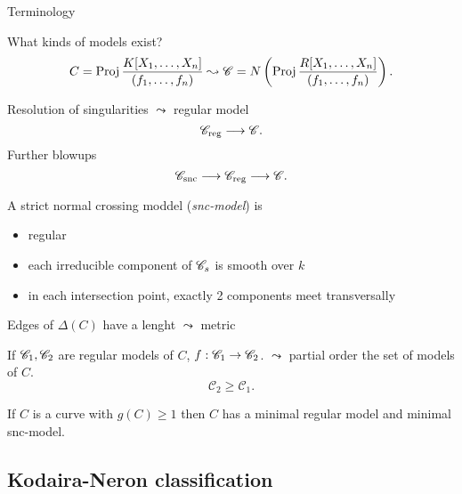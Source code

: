 \begin{frame}{Terminology}
\begin{figure}[ht]
    \centering
\end{figure}
\end{frame}




\begin{frame}[t]
	What kinds of models exist?\[
		C = \operatorname{Proj} \frac{K[X_1, \ldots, X_n]}{(f_1, \ldots, f_n)}
		\leadsto \mathscr C = N\left(\operatorname{Proj} \frac{R[X_1, \ldots, X_n]}{(f_1, \ldots, f_n)}\right)
	.\] 
	\begin{minipage}{.49\textwidth}
	Resolution of singularities $\leadsto $ regular model 
	\[
		\mathscr C _\text{reg}  \longrightarrow \mathscr C 
	.\]
	\pause
	Further blowups \[
	\mathscr {\mathscr C}_\text{snc} \longrightarrow \mathscr {\mathscr C}_\text{reg} \longrightarrow \mathscr {\mathscr C}
	.\]
	\end{minipage}\;\;
	\begin{minipage}{.48\textwidth}
	\begin{definition}
		A strict normal crossing moddel (\emph{snc-model}) is
		\begin{itemize}
			\item regular
			\item each irreducible component of $\mathscr C_s$ is smooth over $k$
			\item in each intersection point, exactly 2 components meet transversally
		\end{itemize}
	\end{definition}
	\end{minipage}

\end{frame}

\begin{frame}
    Edges of $\Delta(C)$ have a lenght $\leadsto$ metric 
\end{frame}
\begin{frame}
	If $\mathscr C_1, \mathscr C_2$ are regular models of $C$, $f: \mathscr C_1 \to \mathscr C_2$.
	$\leadsto$ partial order the set of models of $C$. 
	\[
	\mathscr C_2 \ge \mathscr C_1
	.\] 
\begin{theorem}
		If $C$ is a curve with $g(C) \ge 1$ then $C$ has a minimal regular model and minimal snc-model.
\end{theorem}
\end{frame}





\subsection{Kodaira-Neron classification} \label{sec:kodaira-neron_classification}

